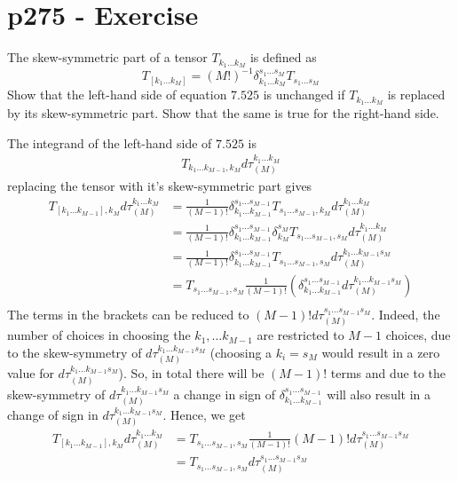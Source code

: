 \section{p275 - Exercise }
\begin{tcolorbox}
The skew-symmetric part of a tensor $T_{k_1\dots k_M}$ is defined as  
$$ T_{\left [k_1 \dots k_M\right ]}= \left(M!\right)^{-1}\delta_{k_1 \dots k_M}^{s_1 \dots s_M} T_{s_1\dots s_M}$$
Show that the left-hand side of equation $\mathbf{7.525}$ is unchanged if $T_{k_1\dots k_M}$ is replaced by its skew-symmetric part. Show that the same is true for the right-hand side.
\end{tcolorbox}
The integrand of the left-hand side of $\mathbf{7.525}$ is
\begin{align}
T_{k_1\dots k_{M-1},k_M}d\tau_{(M)}^{k_1\dots k_M}
\end{align}
replacing the tensor with it's skew-symmetric part gives
\begin{align}
T_{\left [k_1 \dots k_{M-1}\right ],k_M}d\tau_{(M)}^{k_1\dots k_M}&= \frac{1}{\left(M-1\right)!}\delta_{k_1 \dots k_{M-1}}^{s_1 \dots s_{M-1}} T_{s_1\dots s_{M-1},k_M}d\tau_{(M)}^{k_1\dots k_M}\\
&= \frac{1}{\left(M-1\right)!}\delta_{k_1 \dots k_{M-1}}^{s_1 \dots s_{M-1}} \delta^{s_M}_{k_M}T_{s_1\dots s_{M-1},s_M}d\tau_{(M)}^{k_1\dots k_M}\\
&= \frac{1}{\left(M-1\right)!}\delta_{k_1 \dots k_{M-1}}^{s_1 \dots s_{M-1}} T_{s_1\dots s_{M-1},s_M}d\tau_{(M)}^{k_1\dots k_{M-1}s_M}\\
&=T_{s_1\dots s_{M-1},s_M} \frac{1}{\left(M-1\right)!}\left(\delta_{k_1 \dots k_{M-1}}^{s_1 \dots s_{M-1}} d\tau_{(M)}^{k_1\dots k_{M-1}s_M}\right)\\
\end{align}
The terms in the brackets can be reduced to $\left(M-1\right)! d\tau_{(M)}^{s_1\dots s_{M-1}s_M}$. Indeed, the number of choices in choosing the $k_1,\dots k_{M-1}$ are restricted to $M-1$ choices, due to the skew-symmetry of $d\tau_{(M)}^{k_1\dots k_{M-1}s_M}$ (choosing a $k_i= s_M$ would result in a zero value for $d\tau_{(M)}^{k_1\dots k_{M-1}s_M}$). So, in total there will be $ \left(M-1\right)!$ terms and due to the skew-symmetry of $d\tau_{(M)}^{k_1\dots k_{M-1}s_M}$  a change in sign of $\delta_{k_1 \dots k_{M-1}}^{s_1 \dots s_{M-1}}$ will also result in a change of sign in $d\tau_{(M)}^{k_1\dots k_{M-1}s_M}$.
Hence, we get 
\begin{align}
T_{\left [k_1 \dots k_{M-1}\right ],k_M}d\tau_{(M)}^{k_1\dots k_M}
&=T_{s_1\dots s_{M-1},s_M} \frac{1}{\left(M-1\right)!}\left(M-1\right)! d\tau_{(M)}^{s_1\dots s_{M-1}s_M}\\
&=T_{s_1\dots s_{M-1},s_M} d\tau_{(M)}^{s_1\dots s_{M-1}s_M}
\end{align}
